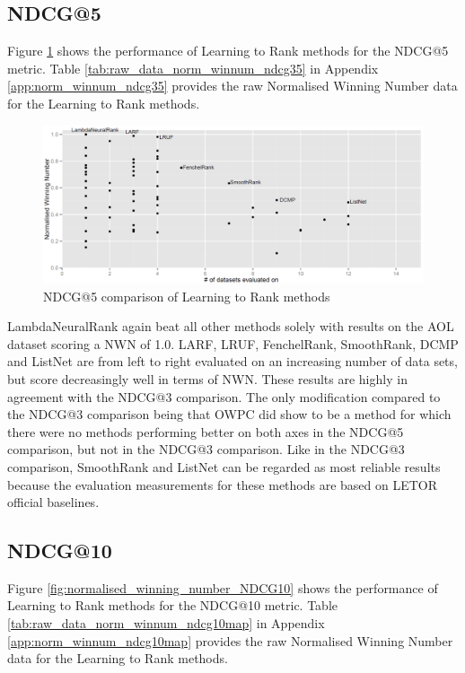 \subsection{NDCG@5}
Figure \ref{fig:normalised_winning_number_NDCG5} shows the performance of Learning to Rank methods for the \ac{NDCG}@5 metric. Table \ref{tab:raw_data_norm_winnum_ndcg35} in Appendix \ref{app:norm_winnum_ndcg35} provides the raw Normalised Winning Number data for the Learning to Rank methods.\\

\begin{figure}[!h]
\includegraphics[scale=0.285]{gfx/ndcg5_winnum}
\caption{\acs{NDCG}@5 comparison of Learning to Rank methods}
\label{fig:normalised_winning_number_NDCG5}
\end{figure}

LambdaNeuralRank again beat all other methods solely with results on the AOL dataset scoring a \ac{NWN} of 1.0. LARF, LRUF, FenchelRank, SmoothRank, DCMP and ListNet are from left to right evaluated on an increasing number of data sets, but score decreasingly well in terms of \ac{NWN}. These results are highly in agreement with the \ac{NDCG}@3 comparison. The only modification compared to the \ac{NDCG}@3 comparison being that OWPC did show to be a method for which there were no methods performing better on both axes in the \ac{NDCG}@5 comparison, but not in the \ac{NDCG}@3 comparison. Like in the \ac{NDCG}@3 comparison, SmoothRank and ListNet can be regarded as most reliable results because the evaluation measurements for these methods are based on LETOR official baselines.

\subsection{NDCG@10}
Figure \ref{fig:normalised_winning_number_NDCG10} shows the performance of Learning to Rank methods for the \ac{NDCG}@10 metric. Table \ref{tab:raw_data_norm_winnum_ndcg10map} in Appendix \ref{app:norm_winnum_ndcg10map} provides the raw Normalised Winning Number data for the Learning to Rank methods.\\

